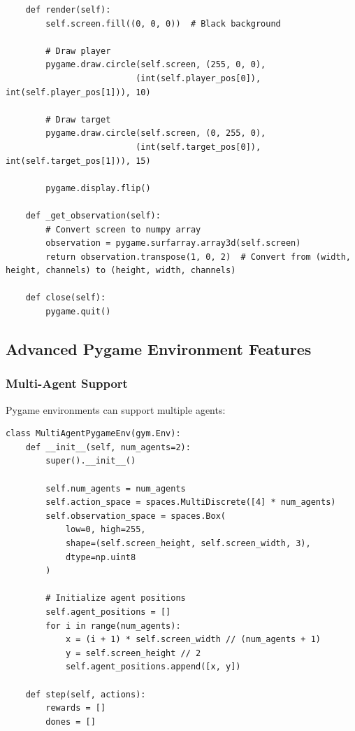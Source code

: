 \documentclass[12pt]{article}
\begin{document}
{{{\begin{verbatim}
    def render(self):
        self.screen.fill((0, 0, 0))  # Black background
        
        # Draw player
        pygame.draw.circle(self.screen, (255, 0, 0), 
                          (int(self.player_pos[0]), int(self.player_pos[1])), 10)
        
        # Draw target
        pygame.draw.circle(self.screen, (0, 255, 0), 
                          (int(self.target_pos[0]), int(self.target_pos[1])), 15)
        
        pygame.display.flip()
        
    def _get_observation(self):
        # Convert screen to numpy array
        observation = pygame.surfarray.array3d(self.screen)
        return observation.transpose(1, 0, 2)  # Convert from (width, height, channels) to (height, width, channels)
        
    def close(self):
        pygame.quit()
\end{verbatim}

\subsection{Advanced Pygame Environment Features}

\subsubsection{Multi-Agent Support}

Pygame environments can support multiple agents:

\begin{verbatim}
class MultiAgentPygameEnv(gym.Env):
    def __init__(self, num_agents=2):
        super().__init__()
        
        self.num_agents = num_agents
        self.action_space = spaces.MultiDiscrete([4] * num_agents)
        self.observation_space = spaces.Box(
            low=0, high=255, 
            shape=(self.screen_height, self.screen_width, 3), 
            dtype=np.uint8
        )
        
        # Initialize agent positions
        self.agent_positions = []
        for i in range(num_agents):
            x = (i + 1) * self.screen_width // (num_agents + 1)
            y = self.screen_height // 2
            self.agent_positions.append([x, y])
            
    def step(self, actions):
        rewards = []
        dones = []
        

\end{verbatim}}}}
\end{document}
